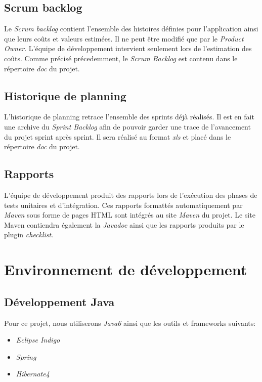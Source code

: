 \documentclass[11pt]{article}
\begin{document}
\subsection{Scrum backlog}

Le \emph{Scrum backlog} contient l'ensemble des histoires définies pour
l'application ainsi que leurs coûts et valeurs estimées. Il ne peut être modifié
que par le \emph{Product Owner}. L'équipe de développement intervient seulement
lors de l'estimation des coûts. Comme précisé précedemment, le \emph{Scrum Backlog} est contenu dans le répertoire \emph{doc} du projet.

\subsection{Historique de planning}

L'historique de planning retrace l'ensemble des sprints déjà réalisés. Il est en fait une archive du \emph{Sprint Backlog} afin de pouvoir garder une trace de l'avancement du projet sprint après sprint. Il sera réalisé au format \emph{xls} et placé dans le répertoire \emph{doc} du projet.

\subsection{Rapports}

L'équipe de développement produit des rapports lors de l'exécution des phases
de tests unitaires et d'intégration. Ces rapports formattés automatiquement
par \emph{Maven} sous forme de pages HTML sont intégrés au site \emph{Maven} du
projet. Le site Maven contiendra également la \emph{Javadoc} ainsi que les rapports produits par le plugin \emph{checklist}.


\section{Environnement de développement}
\label{env-dev}

\subsection{Développement Java}

Pour ce projet, nous utiliserons \emph{Java6} ainsi que les outils et frameworks suivants:

\begin{itemize}
\item \emph{Eclipse Indigo}
\item \emph{Spring}
\item \emph{Hibernate4}
\end{itemize}
\end{document}
